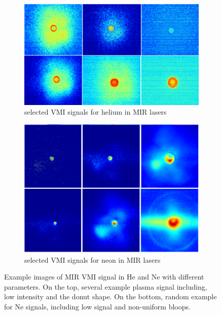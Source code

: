 \begin{figure}[h!]
\centering
\begin{subfigure}[]{0.7\textwidth}
\caption{selected VMI signals for helium in MIR lasers}
\includegraphics[width=1\textwidth]{../Images/Raw_He_ramdom.png} \end{subfigure} 
\begin{subfigure}[]{0.7\textwidth}
\caption{selected VMI signals for neon in MIR lasers}
\includegraphics[width=1\textwidth]{../Images/Raw_Ne_ramdom.png} \end{subfigure} 
\caption[VMI raw images example]{Example images of MIR VMI signal in He and Ne with different parameters. On the top, several example plasma signal including, low intensity and the donut shape. On the bottom, random example for Ne signals, including low signal and non-uniform bloops.}
\label{fig:vmiexample}
\end{figure}



